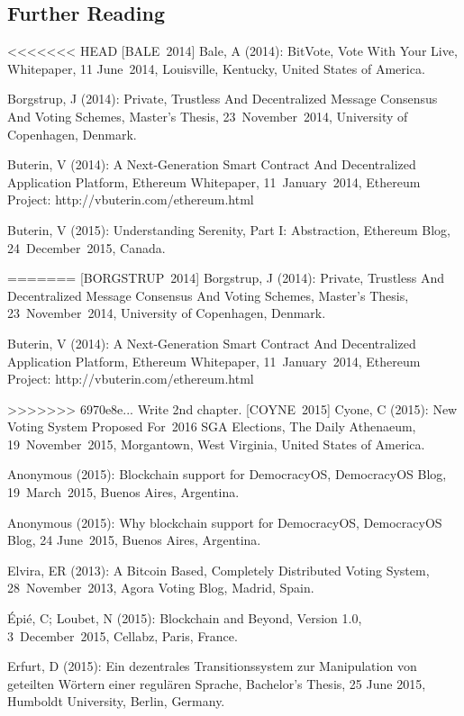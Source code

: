 \documentclass[9pt,oneside]{amsart}
\begin{document}
\begin{multicols}{2}
\section{Further Reading}
<<<<<<< HEAD
[BALE~2014] Bale, A (2014): BitVote, Vote With Your Live, Whitepaper, 11 June~2014, Louisville, Kentucky, United States of America.\par
[BORGSTRUP~2014] Borgstrup, J (2014): Private, Trustless And Decentralized Message Consensus And Voting Schemes, Master's Thesis, 23~November~2014, University of Copenhagen, Denmark.\par
[BUTERIN~2014] Buterin, V (2014): A Next-Generation Smart Contract And Decentralized Application Platform, Ethereum Whitepaper, 11~January~2014, Ethereum Project: http://vbuterin.com/ethereum.html\par
[BUTERIN~2015] Buterin, V (2015): Understanding Serenity, Part I: Abstraction, Ethereum Blog, 24~December~2015, Canada.\par
=======
[BORGSTRUP~2014] Borgstrup, J (2014): Private, Trustless And Decentralized Message Consensus And Voting Schemes, Master's Thesis, 23~November~2014, University of Copenhagen, Denmark.\par
[BUTERIN~2014] Buterin, V (2014): A Next-Generation Smart Contract And Decentralized Application Platform, Ethereum Whitepaper, 11~January~2014, Ethereum Project: http://vbuterin.com/ethereum.html\par
>>>>>>> 6970e8e... Write 2nd chapter.
[COYNE~2015] Cyone, C (2015): New Voting System Proposed For~2016 SGA Elections, The Daily Athenaeum, 19~November~2015, Morgantown, West Virginia, United States of America.\par
[DEMOCRACYOS~2015A] Anonymous (2015): Blockchain support for DemocracyOS, DemocracyOS Blog, 19~March~2015, Buenos Aires, Argentina.\par
[DEMOCRACYOS~2015B] Anonymous (2015): Why blockchain support for DemocracyOS, DemocracyOS Blog, 24 June~2015, Buenos Aires, Argentina.\par
[ELVIRA~2013] Elvira, ER (2013): A Bitcoin Based, Completely Distributed Voting System, 28~November~2013, Agora Voting Blog, Madrid, Spain.\par
[ÉPIÉ~et~al.~2015] Épié, C; Loubet, N (2015): Blockchain and Beyond, Version 1.0, 3~December~2015, Cellabz, Paris, France.\par
[ERFURT~2015] Erfurt, D (2015): Ein dezentrales Transitionssystem zur Manipulation von geteilten Wörtern einer regulären Sprache, Bachelor's Thesis, 25 June 2015, Humboldt University, Berlin, Germany.\par

\end{multicols}
\end{document}
